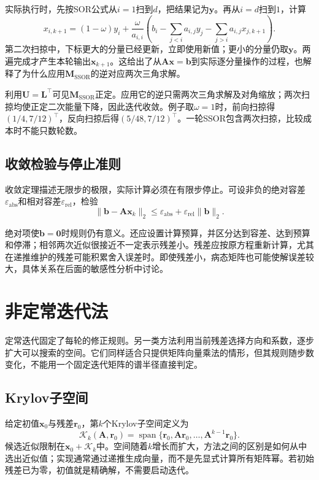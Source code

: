 实际执行时，先按SOR公式从$i=1$扫到$d$，把结果记为$\bm y$。再从$i=d$扫到$1$，计算
\[
 x_{i,k+1}=(1-\omega)y_i+
 \frac{\omega}{a_{i,i}}\left(b_i-\sum_{j<i}a_{i,j}y_j-\sum_{j>i}a_{i,j}x_{j,k+1}\right).
\]
第二次扫掠中，下标更大的分量已经更新，立即使用新值；更小的分量仍取$\bm y$。两遍完成才产生本轮输出$\bm x_{k+1}$。这给出了从$\bm A\bm x=\bm b$到实际逐分量操作的过程，也解释了为什么应用$\bm M_{\mathrm{SSOR}}$的逆对应两次三角求解。

利用$\bm U=\bm L^\top$可见$\bm M_{\mathrm{SSOR}}$正定。应用它的逆只需两次三角求解及对角缩放；两次扫掠均使正定二次能量下降，因此迭代收敛。例子取$\omega=1$时，前向扫掠得$(1/4,7/12)^\top$，反向扫掠后得$(5/48,7/12)^\top$。一轮SSOR包含两次扫掠，比较成本时不能只数轮数。

\subsection{收敛检验与停止准则}

收敛定理描述无限步的极限，实际计算必须在有限步停止。可设非负的绝对容差$\varepsilon_{\mathrm{abs}}$和相对容差$\varepsilon_{\mathrm{rel}}$，检验
\[
 \lVert\bm b-\bm A\bm x_{k}\rVert_2
 \leq \varepsilon_{\mathrm{abs}}+\varepsilon_{\mathrm{rel}}\lVert\bm b\rVert_2.
\]

绝对项使$\bm b=\bm0$时规则仍有意义。还应设置计算预算，并区分达到容差、达到预算和停滞；相邻两次近似很接近不一定表示残差小。残差应按原方程重新计算，尤其在递推维护的残差可能积累舍入误差时。即使残差小，病态矩阵也可能使解误差较大，具体关系在后面的敏感性分析中讨论。

\section{非定常迭代法}
\label{sec:ls-krylov-iterations}

定常迭代固定了每轮的修正规则。另一类方法利用当前残差选择方向和系数，逐步扩大可以搜索的空间。它们同样适合只提供矩阵向量乘法的情形，但其规则随步数变化，不能用一个固定迭代矩阵的谱半径直接判定。

\subsection{Krylov子空间}

给定初值$\bm x_{0}$与残差$\bm r_{0}$，第$k$个Krylov子空间定义为
\[
 \mathcal K_k(\bm A,\bm r_{0})=\operatorname{span}\{\bm r_{0},\bm A\bm r_{0},\ldots,\bm A^{k-1}\bm r_{0}\}.
\]
候选近似限制在$\bm x_{0}+\mathcal K_k$中。空间随着$k$增长而扩大，方法之间的区别是如何从中选出近似值；实现通常通过递推生成向量，而不是先显式计算所有矩阵幂。若初始残差已为零，初值就是精确解，不需要启动迭代。


